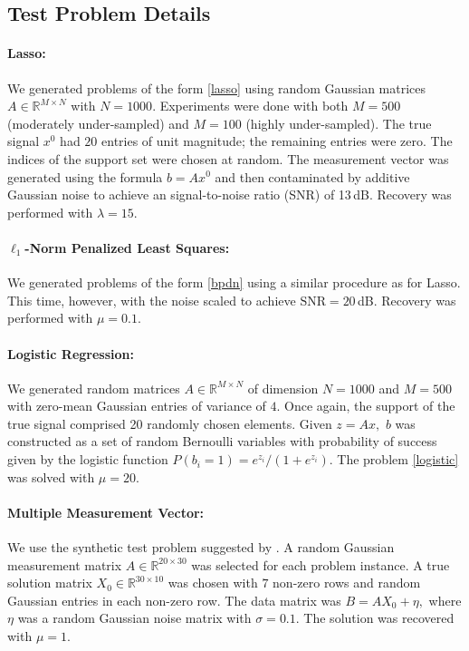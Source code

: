 \documentclass{amsart}
\newcommand{\reals}{\mathbb{R}}
\theoremstyle{definition}
\begin{document}
\newpage
\subsection{Test Problem Details}


\paragraph{\textbf{Lasso:}}\label{sec:lassoRes}

We generated problems of the form \eqref{lasso} using random Gaussian matrices $A\in\reals^{M\times N}$ with $N=1000.$ Experiments were done with both $M=500$ (moderately under-sampled) and $M = 100$ (highly under-sampled).  The true signal $x^0$ had $20$ entries of unit magnitude; the remaining entries were zero.   The indices of the support set were chosen at random.    The measurement vector was generated using the formula $b=Ax^0$ and then contaminated by additive Gaussian noise to achieve an signal-to-noise ratio (SNR) of 13\,dB. Recovery was  performed with $\lambda = 15.$

\paragraph{\textbf{${\boldsymbol\ell_1}$-Norm Penalized Least Squares:}}

We generated problems of the form \eqref{bpdn} using a similar procedure as for Lasso. This time, however, with the noise scaled to achieve $\text{SNR}=20$\,dB. Recovery was performed with $\mu = 0.1.$

\paragraph{\textbf{Logistic Regression:}}
 
We generated random matrices $A\in\reals^{M\times N}$ of dimension  $N=1000$ and $M=500$ with zero-mean Gaussian entries of variance of $4$.  Once again, the support of the true signal comprised 20 randomly chosen elements.  Given $z = Ax,$ $b$ was constructed as a set of random Bernoulli variables with probability of success given by the logistic function $P(b_i=1)=e^{z_i}/(1+e^{z_i}).$  The problem \eqref{logistic} was solved with $\mu = 20.$

\paragraph{\textbf{Multiple Measurement Vector:}}
We use the synthetic test problem suggested by \cite{CREK05}.  A random Gaussian measurement matrix $A\in \reals^{20\times 30}$ was selected for each problem instance.  A true solution matrix $X_0\in \reals^{30\times 10}$ was chosen with $7$ non-zero rows and random Gaussian entries in each non-zero row.  The data matrix was $B = AX_0+\eta,$ where $\eta$ was a random Gaussian noise matrix with $\sigma = 0.1.$   The solution was recovered with $\mu = 1.$
\end{document}
